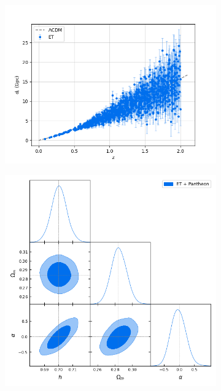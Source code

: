 \begin{figure}[h!]
    \centering
    \begin{subfigure}[t]{0.49\textwidth}
        \centering
        \includegraphics[width=\textwidth]{figures/ET-4.png}
    \end{subfigure}
    \hfill
    \begin{subfigure}[t]{0.49\textwidth}
        \centering
        \includegraphics[width=\textwidth]{figures/fQ-LCDM-bg_ET-4_pantheon-binned.png}

\end{subfigure}
\end{figure}
